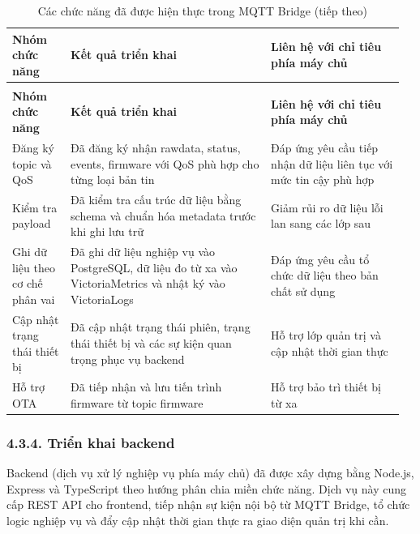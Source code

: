 \documentclass[a4paper]{extarticle}
\newcommand{\thesisterm}[1]{{\rmfamily #1}}
\newcommand{\thesissettableid}[2]{%
  \renewcommand{\thetable}{#1}%
  \renewcommand{\theHtable}{#2}%
}
\begin{document}
{\thesissettableid{4.10}{condensed-bang-4-10-cac-chuc-nang-da-duoc-hien-thuc-trong-mqtt-bridge}
\def\LTcaptype{table}
\begin{longtable}{|L{0.148\linewidth}|L{0.483\linewidth}|L{0.328\linewidth}|}
\caption{Các chức năng đã được hiện thực trong MQTT Bridge}\label{tab:condensed-bang-4-10-cac-chuc-nang-da-duoc-hien-thuc-trong-mqtt-bridge}\\
\hline
\textbf{Nhóm chức năng} & \textbf{Kết quả triển khai} & \textbf{Liên hệ với chỉ tiêu phía máy chủ} \\
\hline
\endfirsthead
\caption[]{Các chức năng đã được hiện thực trong MQTT Bridge (tiếp theo)}\\
\hline
\textbf{Nhóm chức năng} & \textbf{Kết quả triển khai} & \textbf{Liên hệ với chỉ tiêu phía máy chủ} \\
\hline
\endhead
\endfoot
\endlastfoot
Đăng ký topic và QoS & Đã đăng ký nhận \thesisterm{rawdata}, \thesisterm{status}, \thesisterm{events}, \thesisterm{firmware} với QoS phù hợp cho từng loại bản tin & Đáp ứng yêu cầu tiếp nhận dữ liệu liên tục với mức tin cậy phù hợp \\\hline
Kiểm tra payload & Đã kiểm tra cấu trúc dữ liệu bằng schema và chuẩn hóa metadata trước khi ghi lưu trữ & Giảm rủi ro dữ liệu lỗi lan sang các lớp sau \\\hline
Ghi dữ liệu theo cơ chế phân vai & Đã ghi dữ liệu nghiệp vụ vào PostgreSQL, dữ liệu đo từ xa vào VictoriaMetrics và nhật ký vào VictoriaLogs & Đáp ứng yêu cầu tổ chức dữ liệu theo bản chất sử dụng \\\hline
Cập nhật trạng thái thiết bị & Đã cập nhật trạng thái phiên, trạng thái thiết bị và các sự kiện quan trọng phục vụ backend & Hỗ trợ lớp quản trị và cập nhật thời gian thực \\\hline
Hỗ trợ OTA & Đã tiếp nhận và lưu tiến trình firmware từ topic \thesisterm{firmware} & Hỗ trợ bảo trì thiết bị từ xa \\\hline
\end{longtable}
}

\subsubsection{4.3.4. Triển khai backend}\label{triux1ec3n-khai-backend}

Backend (dịch vụ xử lý nghiệp vụ phía máy chủ) đã được xây dựng bằng Node.js,
Express và TypeScript theo hướng phân chia miền chức năng. Dịch vụ này cung cấp
REST API cho frontend, tiếp nhận sự kiện nội bộ từ MQTT Bridge, tổ chức logic
nghiệp vụ và đẩy cập nhật thời gian thực ra giao diện quản trị khi cần.
\end{document}

